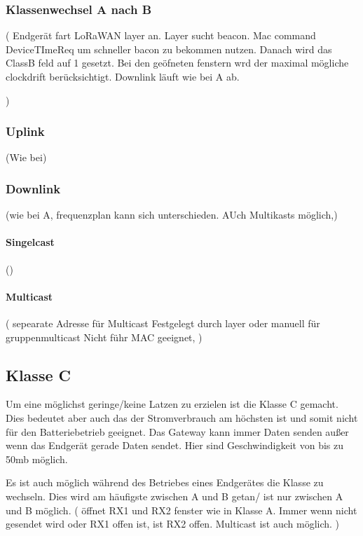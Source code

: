 \documentclass[a4paper,12pt]{article}
\begin{document}
            \subsubsection{Klassenwechsel A nach B}
                \cite{LoRaSpec}(
                    Endgerät fart LoRaWAN layer an. Layer sucht beacon. Mac command DeviceTImeReq um schneller bacon zu bekommen nutzen. Danach wird das ClassB feld auf 1 gesetzt. Bei den geöfneten fenstern wrd der maximal mögliche clockdrift berücksichtigt.
                    Downlink läuft wie bei A ab.


                )
            \subsubsection{Uplink}
                \cite{LoRaSpec}(Wie bei)
            \subsubsection{Downlink}
                \cite{LoRaSpec}(wie bei A, frequenzplan kann sich unterschieden. AUch Multikasts möglich,)
                \paragraph{Singelcast}
                    \cite{LoRaSpec}()
                \paragraph{Multicast}
                    \cite{LoRaSpec}(
                        sepearate Adresse für Multicast
                        Festgelegt durch layer oder manuell für gruppenmulticast
                        Nicht führ MAC geeignet, 
                    )

        \subsection{Klasse C}
            Um eine möglichst geringe/keine Latzen zu erzielen ist die Klasse C gemacht. Dies bedeutet aber auch das der Stromverbrauch am höchsten ist und somit nicht für den Batteriebetrieb geeignet.
            Das Gateway kann immer Daten senden außer wenn das Endgerät gerade Daten sendet. Hier sind Geschwindigkeit von bis zu 50mb möglich.

            Es ist auch möglich während des Betriebes eines Endgerätes die Klasse zu wechseln. Dies wird am häufigste zwischen A und B getan/ ist nur zwischen A und B möglich.
            \cite{LoRaSpec}(
                öffnet RX1 und RX2 fenster wie in Klasse A. Immer wenn  nicht gesendet wird oder RX1 offen ist, ist RX2 offen. Multicast ist auch möglich.
            )
\end{document}
